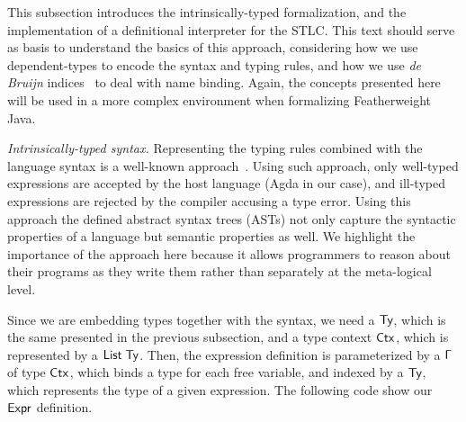 \documentclass[tese,capa,english]{texufpel}
\newcommand{\D}[1]{\blue{\mathsf{#1}}}
\newcommand{\V}[1]{\black{\mathsf{#1}}}
\begin{document}
This subsection introduces the intrinsically-typed formalization, and the implementation of a definitional interpreter for the STLC. This text should serve as basis to understand the basics of this approach, considering how we use dependent-types to encode the syntax and typing rules, and how we use \emph{de Bruijn} indices~\cite{DEBRUIJN1972381} to deal with name binding. Again, the concepts presented here will be used in a more complex environment when formalizing Featherweight Java.

\vspace{8pt}
\noindent\emph{Intrinsically-typed syntax.} Representing the typing rules combined with the language syntax is a well-known approach~\cite{Altenkirch:1999:MPL:647849.737066,Reynolds01whatdo}. Using such approach, only well-typed expressions are accepted by the host language (Agda in our case), and ill-typed expressions are rejected by the compiler accusing a type error. Using this approach the defined abstract syntax trees (ASTs) not only capture the syntactic properties of a language but semantic properties as well. We highlight the importance of the approach here because it allows programmers to reason about their programs as they write them rather than separately at the meta-logical level.

Since we are embedding types together with the syntax, we need a \ensuremath{\D{Ty}}, which is the same presented in the previous subsection, and a type context \ensuremath{\D{Ctx}}, which is represented by a \ensuremath{\D{List}\;\D{Ty}}. Then, the expression definition is parameterized by a \ensuremath{\V{\Gamma}} of type \ensuremath{\D{Ctx}}, which binds a type for each free variable, and indexed by a \ensuremath{\D{Ty}}, which represents the type of a given expression. The following code show our \ensuremath{\D{Expr}} definition.
\end{document}
